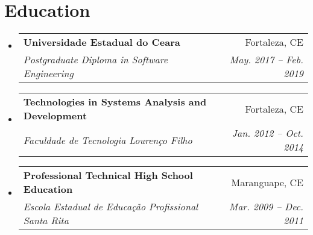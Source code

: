 \documentclass[letterpaper,11pt]{article}
\makeatletter
\newcommand{\resumeItem}[2]{
  \item\small{
    \textbf{#1}{: #2 \vspace{-2pt}}
  }
}
\newcommand{\resumeSubheading}[4]{
  \vspace{-1pt}\item
    \begin{tabular*}{0.97\textwidth}[t]{l@{\extracolsep{\fill}}r}
      \textbf{#1} & #2 \\
      \textit{\small#3} & \textit{\small #4} \\
    \end{tabular*}\vspace{-5pt}
}
\newcommand{\resumeSubSubheading}[2]{
    \begin{tabular*}{0.97\textwidth}{l@{\extracolsep{\fill}}r}
      \textit{\small#1} & \textit{\small #2} \\
    \end{tabular*}\vspace{-5pt}
}
\newcommand{\resumeSubItem}[2]{\resumeItem{#1}{#2}\vspace{-4pt}}
\newcommand{\resumeSubHeadingListStart}{\begin{itemize}[leftmargin=*]}
\newcommand{\resumeSubHeadingListEnd}{\end{itemize}}
\newcommand{\resumeItemListStart}{\begin{itemize}}
\newcommand{\resumeItemListEnd}{\end{itemize}\vspace{-5pt}}
\makeatother
\begin{document}
\section{Education}
\resumeSubHeadingListStart
\resumeSubheading
{Universidade Estadual do Ceara}{Fortaleza, CE}
{Postgraduate Diploma in Software Engineering}{May. 2017 -- Feb. 2019}
\resumeSubheading
{Technologies in Systems Analysis and Development}{Fortaleza, CE}
{Faculdade de Tecnologia Lourenço Filho}{Jan. 2012 -- Oct. 2014}
\resumeSubheading
{Professional Technical High School Education}{Maranguape, CE}
{Escola Estadual de Educação Profissional Santa Rita}{Mar. 2009 -- Dec. 2011}
\resumeSubHeadingListEnd


%
%
\end{document}

